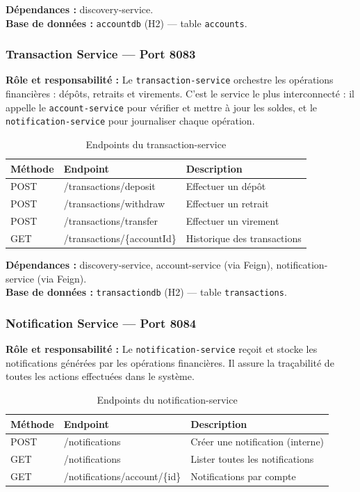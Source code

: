 \documentclass[12pt,a4paper]{article}
\begin{document}
\textbf{Dépendances :} discovery-service.\\
\textbf{Base de données :} \texttt{accountdb} (H2) --- table \texttt{accounts}.

\subsubsection{Transaction Service --- Port 8083}

\textbf{Rôle et responsabilité :} Le \texttt{transaction-service} orchestre les opérations financières : dépôts, retraits et virements. C'est le service le plus interconnecté : il appelle le \texttt{account-service} pour vérifier et mettre à jour les soldes, et le \texttt{notification-service} pour journaliser chaque opération.

\begin{table}[H]
\centering
\caption{Endpoints du transaction-service}
\begin{tabularx}{\textwidth}{|l|l|X|}
\hline
\textbf{Méthode} & \textbf{Endpoint} & \textbf{Description} \\
\hline
POST & /transactions/deposit & Effectuer un dépôt \\
\hline
POST & /transactions/withdraw & Effectuer un retrait \\
\hline
POST & /transactions/transfer & Effectuer un virement \\
\hline
GET & /transactions/\{accountId\} & Historique des transactions \\
\hline
\end{tabularx}
\end{table}

\textbf{Dépendances :} discovery-service, account-service (via Feign), notification-service (via Feign).\\
\textbf{Base de données :} \texttt{transactiondb} (H2) --- table \texttt{transactions}.

\subsubsection{Notification Service --- Port 8084}

\textbf{Rôle et responsabilité :} Le \texttt{notification-service} reçoit et stocke les notifications générées par les opérations financières. Il assure la traçabilité de toutes les actions effectuées dans le système.

\begin{table}[H]
\centering
\caption{Endpoints du notification-service}
\begin{tabularx}{\textwidth}{|l|l|X|}
\hline
\textbf{Méthode} & \textbf{Endpoint} & \textbf{Description} \\
\hline
POST & /notifications & Créer une notification (interne) \\
\hline
GET & /notifications & Lister toutes les notifications \\
\hline
GET & /notifications/account/\{id\} & Notifications par compte \\
\hline
\end{tabularx}
\end{table}
\end{document}
